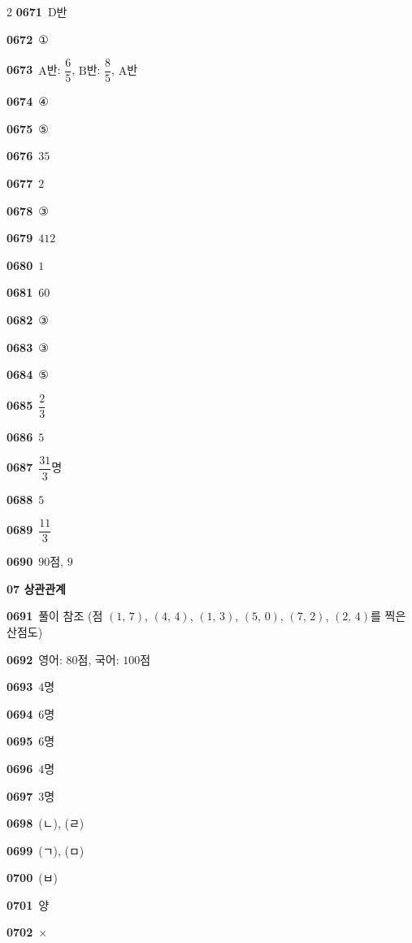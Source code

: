 \documentclass[10pt,a4paper]{article}
\newcommand{\pt}[1]{\mathrm{#1}}
\begin{document}
\begin{multicols}{2}
\noindent\textbf{0671}\ $\pt{D}$반\par
\noindent\textbf{0672}\ ①\par
\noindent\textbf{0673}\ $\pt{A}$반: $\dfrac{6}{5}$, $\pt{B}$반: $\dfrac{8}{5}$, $\pt{A}$반\par
\noindent\textbf{0674}\ ④\par
\noindent\textbf{0675}\ ⑤\par
\noindent\textbf{0676}\ $35$\par
\noindent\textbf{0677}\ $2$\par
\noindent\textbf{0678}\ ③\par
\noindent\textbf{0679}\ $412$\par
\noindent\textbf{0680}\ $1$\par
\noindent\textbf{0681}\ $60$\par
\noindent\textbf{0682}\ ③\par
\noindent\textbf{0683}\ ③\par
\noindent\textbf{0684}\ ⑤\par
\noindent\textbf{0685}\ $\dfrac{2}{3}$\par
\noindent\textbf{0686}\ $5$\par
\noindent\textbf{0687}\ $\dfrac{31}{3}$명\par
\noindent\textbf{0688}\ $5$\par
\noindent\textbf{0689}\ $\dfrac{11}{3}$\par
\noindent\textbf{0690}\ $90$점, $9$\par
\noindent\textbf{07 상관관계}\par\smallskip
\noindent\textbf{0691}\ 풀이 참조 (점 $(1,\,7)$, $(4,\,4)$, $(1,\,3)$, $(5,\,0)$, $(7,\,2)$, $(2,\,4)$를 찍은 산점도)\par
\noindent\textbf{0692}\ 영어: $80$점, 국어: $100$점\par
\noindent\textbf{0693}\ $4$명\par
\noindent\textbf{0694}\ $6$명\par
\noindent\textbf{0695}\ $6$명\par
\noindent\textbf{0696}\ $4$명\par
\noindent\textbf{0697}\ $3$명\par
\noindent\textbf{0698}\ (ㄴ), (ㄹ)\par
\noindent\textbf{0699}\ (ㄱ), (ㅁ)\par
\noindent\textbf{0700}\ (ㅂ)\par
\noindent\textbf{0701}\ 양\par
\noindent\textbf{0702}\ $\times$\par

\end{multicols}
\end{document}
